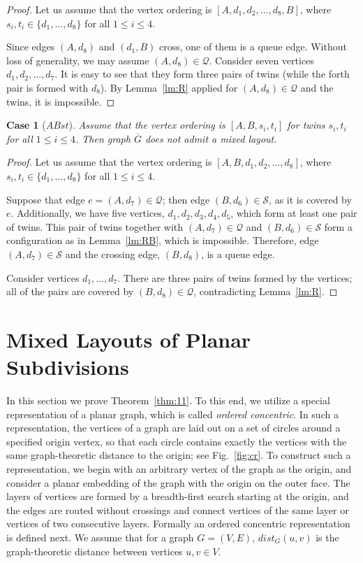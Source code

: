 \documentclass[orivec]{llncs}
\newcommand{\df}[1]{{\it #1}}
\newcommand{\Sh}{{\ensuremath{\mathcal{S}}}}
\newcommand{\Qh}{{\ensuremath{\mathcal{Q}}}}
\newcommand{\Gc}{{\ensuremath{\overline{G}}}}
\newtheorem{cs}{Case}
\begin{document}
\begin{proof}
    Let us assume that the vertex ordering is $[A, d_1, d_2, \dots, d_8, B]$,  
    where $s_i, t_i \in \{d_1, \dots, d_8\}$ for all $1 \le i \le 4$.
    
    Since edges $(A, d_8)$ and $(d_1, B)$ cross, one of them is a queue edge. Without
    loss of generality, we may assume $(A, d_8) \in \Qh$.
    Consider seven vertices $d_1, d_2, \dots, d_7$. It is easy to see that they form three
    pairs of twins (while the forth pair is formed with $d_8$). By Lemma~\ref{lm:R} applied for
    $(A, d_8) \in \Qh$ and the twins, it is impossible.
\end{proof}    

\begin{cs}[$ABst$]
    \label{cs:2}
    Assume that the vertex ordering is $[A, B, s_i, t_i]$ for twins $s_i, t_i$ for all $1 \le i \le 4$.
    Then graph $\Gc$ does not admit a mixed layout.
\end{cs}    

\begin{proof}
    Let us assume that the vertex ordering is $[A, B, d_1, d_2, \dots, d_8]$,  
    where $s_i, t_i \in \{d_1, \dots, d_8\}$ for all $1 \le i \le 4$.

    Suppose that edge $e=(A, d_7) \in \Qh$; then edge $(B, d_6) \in \Sh$, as it is covered by $e$. Additionally,
    we have five vertices, $d_1, d_2, d_3, d_4, d_5$, which form at least one pair of twins.
    This pair of twins together with $(A, d_7) \in \Qh$ and $(B, d_6) \in \Sh$ form a configuration as in Lemma~\ref{lm:RB},
    which is impossible. Therefore, edge $(A, d_7) \in \Sh$ and the crossing edge, $(B, d_8)$, is a queue edge.
    
    Consider vertices $d_1, \dots, d_7$. There are three pairs of twins formed by the vertices; all of the
    pairs are covered by $(B, d_8) \in \Qh$, contradicting Lemma~\ref{lm:R}.
\end{proof}    

\section{Mixed Layouts of Planar Subdivisions}
\label{sect:sub}

In this section we prove Theorem~\ref{thm:11}. To this end,
we utilize a special representation of a planar graph, which 
is called \df{ordered concentric}.
In such a representation, the vertices of a graph are 
laid out on a set of circles around a specified origin vertex, so that each circle contains exactly
the vertices with the same graph-theoretic distance to the origin; see Fig.~\ref{fig:cr}. To construct such a
representation, we begin with an arbitrary 
vertex of the graph as the origin, and consider a planar embedding of the graph with the origin on the outer face.
The layers of vertices are formed by a breadth-first search starting at the origin, and
the edges are routed without crossings and connect vertices of the same layer or vertices
of two consecutive layers. Formally an ordered concentric representation is defined next.
We assume that for a graph $G=(V, E)$, $dist_G(u, v)$ is the graph-theoretic
distance between vertices $u, v \in V$.
\end{document}
